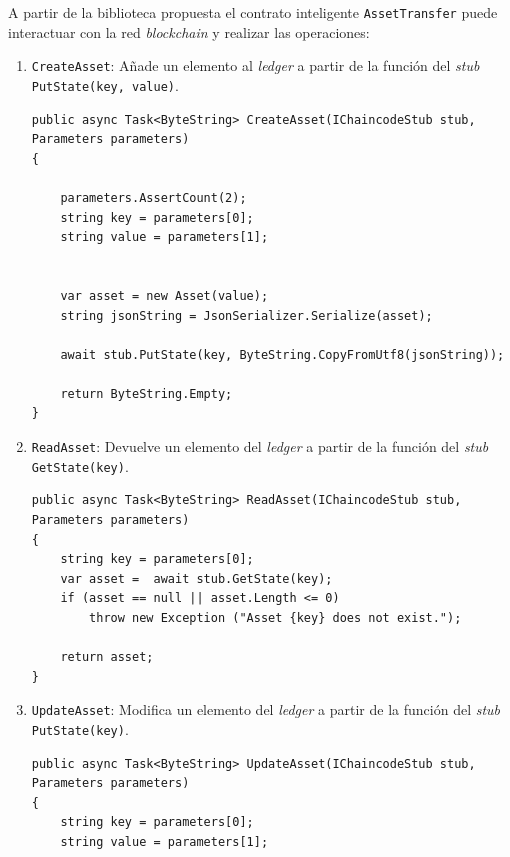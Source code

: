 A partir de la biblioteca propuesta el contrato inteligente \texttt{AssetTransfer} puede interactuar con la red \textit{blockchain} y realizar las operaciones: 

\begin{enumerate}
\item \texttt{CreateAsset}: Añade un elemento al \textit{ledger} a partir de la función del \textit{stub} \texttt{PutState(key, value)}.\\

\begin{lstlisting}[caption={Función \texttt{CreateAsset(...)}}]
public async Task<ByteString> CreateAsset(IChaincodeStub stub, Parameters parameters)
{

    parameters.AssertCount(2);
    string key = parameters[0];
    string value = parameters[1];


    var asset = new Asset(value);
    string jsonString = JsonSerializer.Serialize(asset);

    await stub.PutState(key, ByteString.CopyFromUtf8(jsonString));
    
    return ByteString.Empty;
}
\end{lstlisting}

\item \texttt{ReadAsset}: Devuelve un elemento del \textit{ledger} a partir de la función del \textit{stub} \texttt{GetState(key)}.\\

\begin{lstlisting}[caption={Función \texttt{ReadAsset(...)}}]
 public async Task<ByteString> ReadAsset(IChaincodeStub stub, Parameters parameters)
{
    string key = parameters[0];
    var asset =  await stub.GetState(key);
    if (asset == null || asset.Length <= 0) 
    	throw new Exception ("Asset {key} does not exist.");

    return asset;
}
\end{lstlisting}

\item \texttt{UpdateAsset}: Modifica un elemento del \textit{ledger} a partir de la función del \textit{stub}\texttt{ PutState(key)}.\\

\begin{lstlisting}[caption={Función \texttt{UpdateAsset(...)}}]
public async Task<ByteString> UpdateAsset(IChaincodeStub stub, Parameters parameters)
{
    string key = parameters[0];
    string value = parameters[1];


\end{lstlisting}
\end{enumerate}
